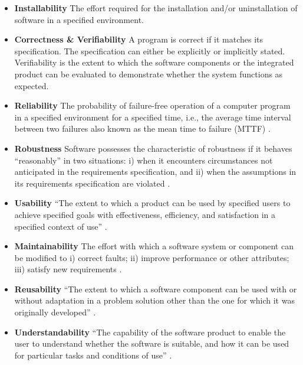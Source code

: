\documentclass[final, 3p, times, authoryear]{elsarticle}
\begin{document}
\begin{itemize}
	\item \textbf{Installability} The effort required for the installation
    and/or uninstallation of software in a specified environment.

	\item \textbf{Correctness \& Verifiability} A program is correct if it
    matches its specification.  The specification can either be explicitly or
    implicitly stated.  Verifiability is the extent to which the software
    components or the integrated product can be evaluated to demonstrate whether
    the system functions as expected.

	\item \textbf{Reliability} The probability of failure-free operation of a
	computer program in a specified environment for a specified time, i.e., the
	average time interval between two failures also known as the mean time to
	failure (MTTF) \citep{musa1987software} \citep{GhezziEtAl2003}.

	\item \textbf{Robustness} Software possesses the characteristic of
	robustness if it behaves ``reasonably'' in two situations: i) when it
	encounters circumstances not anticipated in the requirements specification,
	and ii) when the assumptions in its requirements specification are violated
	\citep{ghezzi1991fundamentals} \citep{boehm2007software}.

	\item \textbf{Usability} ``The extent to which a product can be used by
	specified users to achieve specified goals with effectiveness, efficiency,
	and satisfaction in a specified context of use'' \citep{ISO/TR16982:2002}
	\citep{ISO9241-11:2018}.

	\item \textbf{Maintainability} The effort with which a software system or
	component can be modified to i) correct faults; ii) improve performance or
	other attributes; iii) satisfy new requirements
	\citep{IEEEStdGlossarySET1990} \citep{boehm2007software}.

	\item \textbf{Reusability} ``The extent to which a software component can be
	used with or without adaptation in a problem solution other than the one for
	which it was originally developed'' \citep{kalagiakos2003non}.

	\item \textbf{Understandability} ``The capability of the software product to
	enable the user to understand whether the software is suitable, and how it
	can be used for particular tasks and conditions of use'' \citep{iso2001iec}.


\end{itemize}
\end{document}

